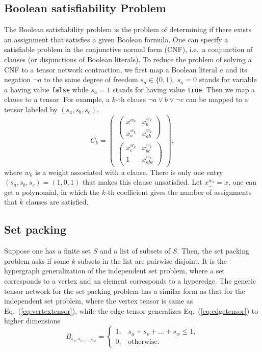 \documentclass[onefignum, onetabnum]{siamart190516}
\newcommand{\<}{\langle}
\renewcommand{\>}{\rangle}
\newcommand{\Eq}[1]{Eq.~(\ref{#1})}
\newcounter{example}
\begin{document}
\subsection{Boolean satisfiability Problem}
The Boolean satisfiability problem is the problem of determining if there exists an assignment that satisfies a given Boolean formula.
One can specify a satisfiable problem in the conjunctive normal form (CNF), i.e.\ a conjunction of clauses (or disjunctions of Boolean literals).
To reduce the problem of solving a CNF to a tensor network contraction, we first map a Boolean literal $a$ and its negation $\neg a$ to the same degree of freedom $s_a \in \{0, 1\}$.
$s_a = 0$ stands for variable $a$ having value \texttt{false} while $s_a=1$ stands for having value \texttt{true}.
Then we map a clause to a tensor. For example, a $k$-th clause $\neg a \vee b \vee \neg c$ can be mapped to a tensor labeled by $(s_a, s_b, s_c)$.
\begin{equation}
C_{k} = \left(\begin{matrix}
\left(\begin{matrix}
x^{w_k} & x_{b}^{w_k} \\
x_a^{w_k} & x_{ab}^{w_k}
\end{matrix}\right) \\
\left(\begin{matrix}
x_{c}^{w_k} & x_{bc}^{w_k} \\
1 & x_{abc}^{w_k}
\end{matrix}\right)
\end{matrix}\right),
\end{equation}
where $w_k$ is a weight associated with a clause. There is only one entry $(s_a, s_b, s_c) = (1, 0, 1)$ that makes this clause unsatisfied.
Let $x^{w_k}_{\ldots} = x$, one can get a polynomial, in which the $k$-th coefficient gives the number of assignments that $k$ clauses are satisfied.

\subsection{Set packing}
Suppose one has a finite set $S$ and a list of subsets of $S$. Then, the set packing problem asks if some $k$ subsets in the list are pairwise disjoint.
It is the hypergraph generalization of the independent set problem, where a set corresponds to a vertex and an element corresponds to a hyperedge.
The generic tensor network for the set packing problem has a similar form as that for the independent set problem, where the vertex tensor is same as \Eq{eq:vertextensor}, while the edge tensor generalizes \Eq{eq:edgetensor} to higher dimensions
\begin{equation}
    B_{s_u,s_v,\ldots, s_w} = \begin{cases}
        1, & s_u+s_v+\ldots+s_w\leq 1,\\
        0, & \text{otherwise}.
    \end{cases}
\end{equation}
\end{document}
